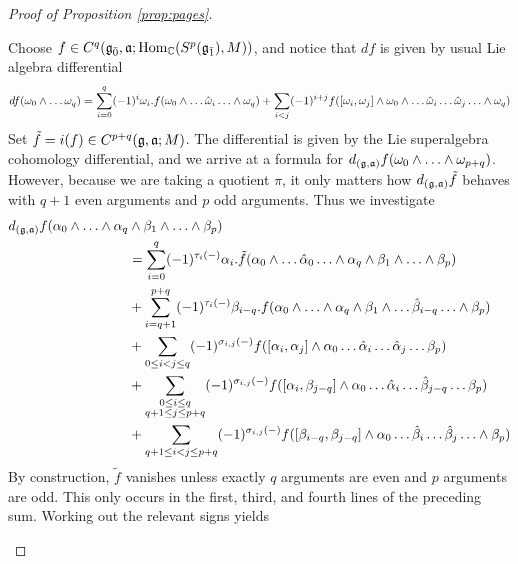 \begin{proof}[Proof of Proposition \ref{prop:pages}]
\begin{enumerate}[(a)]
  Choose $f \in C^q({\mathfrak{g}}_{\bar{0}},\mathfrak{a};\operatorname{Hom}_{\mathbb{C}}(S^p({\mathfrak{g}}_{\bar{1}}),M))$, and notice that $df$ is given by usual Lie algebra differential
  \[
df(\omega_0 \wedge \ldots \omega_q) = \sum_{i = 0}^q (-1)^i \omega_i.f(\omega_0 \wedge \ldots \hat {\omega}_i \ldots \wedge \omega_q) + \sum_{i < j} (-1)^{i+j}f([\omega_i,\omega_j] \wedge \omega_0 \wedge \ldots \hat {\omega}_i \ldots \hat {\omega}_j \ldots \wedge \omega_q)
  \]
  Set $\tilde f = i(f) \in C^{p+q}(\mathfrak{g},\mathfrak{a};M)$. The differential is given by the Lie superalgebra cohomology differential, and we arrive at a formula for $d_{(\mathfrak{g},\mathfrak{a})}f(\omega_0 \wedge \ldots \wedge \omega_{p+q})$. However, because we are taking a quotient $\pi$, it only matters how $d_{(\mathfrak{g},\mathfrak{a})}\tilde{f}$ behaves with $q+1$ even arguments and $p$ odd arguments. Thus we investigate
  \begin{align}
    \begin{split}
    d_{(\mathfrak{g},\mathfrak{a})}f(\alpha_0\wedge \ldots \wedge \alpha_q& \wedge \beta_1 \wedge \ldots \wedge \beta_p)\\& = \sum_{i = 0}^q (-1)^{\tau_i(-)} \alpha_i.\tilde{f}(\alpha_0\wedge \ldots \hat \alpha_0 \ldots \wedge \alpha_q \wedge \beta_1 \wedge \ldots \wedge \beta_p) \\
                                                                                                    &+ \sum_{i = q+1}^{p+q} (-1)^{\tau_i(-)} \beta_{i - q}.f(\alpha_0 \wedge \ldots \wedge \alpha_q \wedge \beta_1 \wedge \ldots \hat \beta_{i-q} \ldots \wedge \beta_p) \\
                                                                                                    &+ \sum_{0 \leq i < j \leq q} (-1)^{\sigma_{i,j}(-)}f([\alpha_i,\alpha_j] \wedge \alpha_0 \ldots \hat \alpha_i \ldots \hat \alpha_j \ldots \beta_p) \\
                                                                                                    &+ \sum_{\substack{0 \leq i \leq q \\ q+1 \leq j \leq p+q}} (-1)^{\sigma_{i,j}(-)} f([\alpha_i,\beta_{j-q}] \wedge \alpha_0 \ldots \hat \alpha_i \ldots \hat \beta_{j-q} \ldots \beta_p) \\
    &+ \sum_{q+1 \leq i < j \leq p+q} (-1)^{\sigma_{i,j}(-)} f([\beta_{i-q},\beta_{j-q}]\wedge \alpha_0 \ldots \hat \beta_i \ldots \hat \beta_j \ldots \wedge \beta_p)
  \end{split}
  \end{align}
  By construction, $\tilde{f}$ vanishes unless exactly $q$ arguments are even and $p$ arguments are odd. This only occurs in the first, third, and fourth lines of the preceding sum. Working out the relevant signs yields

\end{enumerate}
\end{proof}
